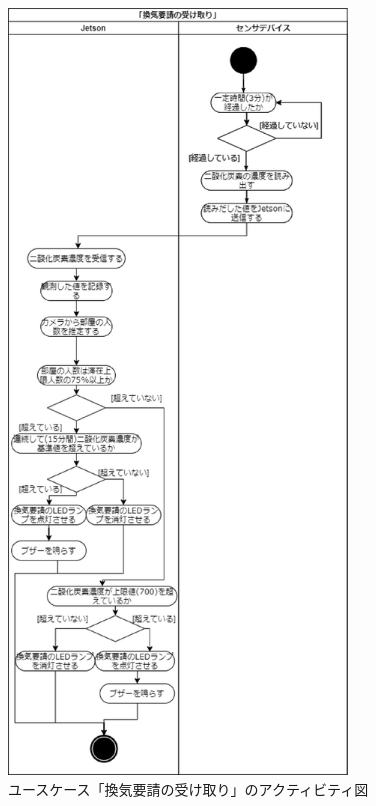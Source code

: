 \begin{figure}[htbp]
    \centering
    \includegraphics[width = 9cm]{./picture/activity_kanki_1.eps}
    \caption{ユースケース「換気要請の受け取り」のアクティビティ図}
    \label{act_kanki}
\end{figure}
